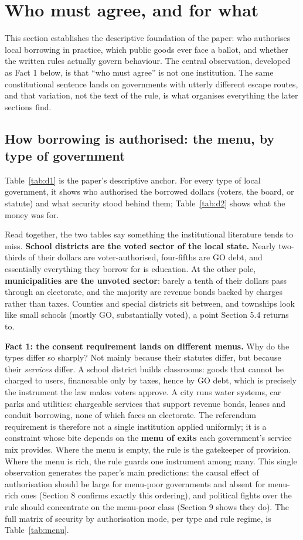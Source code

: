 \section{Who must agree, and for what}
This section establishes the descriptive foundation of the paper: who authorises local borrowing in practice, which public goods ever face a ballot, and whether the written rules actually govern behaviour. The central observation, developed as Fact 1 below, is that ``who must agree'' is not one institution. The same constitutional sentence lands on governments with utterly different escape routes, and that variation, not the text of the rule, is what organises everything the later sections find.

\subsection{How borrowing is authorised: the menu, by type of government}
Table~\ref{tab:d1} is the paper's descriptive anchor. For every type of local government, it shows who authorised the borrowed dollars (voters, the board, or statute) and what security stood behind them; Table~\ref{tab:d2} shows what the money was for.



Read together, the two tables say something the institutional literature tends to miss. \textbf{School districts are the voted sector of the local state.} Nearly two-thirds of their dollars are voter-authorised, four-fifths are GO debt, and essentially everything they borrow for is education. At the other pole, \textbf{municipalities are the unvoted sector}: barely a tenth of their dollars pass through an electorate, and the majority are revenue bonds backed by charges rather than taxes. Counties and special districts sit between, and townships look like small schools (mostly GO, substantially voted), a point Section 5.4 returns to.

\textbf{Fact 1: the consent requirement lands on different menus.} Why do the types differ so sharply? Not mainly because their statutes differ, but because their \emph{services} differ. A school district builds classrooms: goods that cannot be charged to users, financeable only by taxes, hence by GO debt, which is precisely the instrument the law makes voters approve. A city runs water systems, car parks and utilities: chargeable services that support revenue bonds, leases and conduit borrowing, none of which faces an electorate. The referendum requirement is therefore not a single institution applied uniformly; it is a constraint whose bite depends on the \textbf{menu of exits} each government's service mix provides. Where the menu is empty, the rule is the gatekeeper of provision. Where the menu is rich, the rule guards one instrument among many. This single observation generates the paper's main predictions: the causal effect of authorisation should be large for menu-poor governments and absent for menu-rich ones (Section 8 confirms exactly this ordering), and political fights over the rule should concentrate on the menu-poor class (Section 9 shows they do). The full matrix of security by authorisation mode, per type and rule regime, is Table~\ref{tab:menu}.

